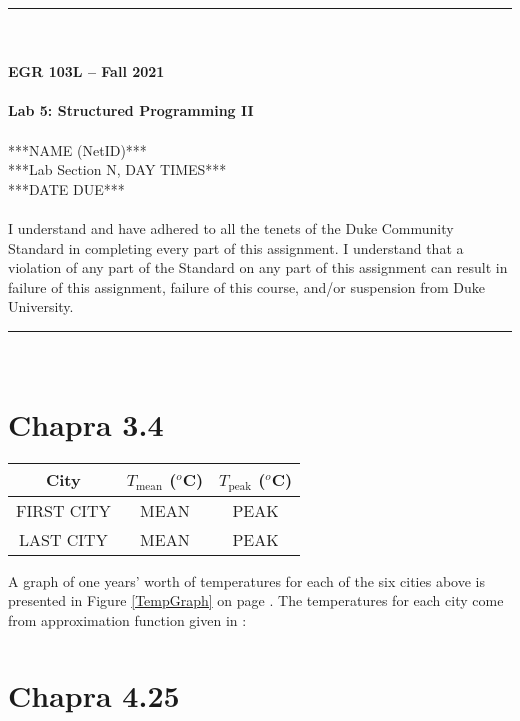 \documentclass{article}
\begin{document}
\begin{center}
\rule{6.5in}{0.5mm}\\~\\
\textbf{\large EGR 103L -- Fall 2021}\\~\\
\textbf{\huge Lab 5: Structured Programming II}\\~\\
***NAME (NetID)***\\
***Lab Section N, DAY TIMES***\\
***DATE DUE***\\~\\
{\small I understand and have adhered to all the tenets of the Duke Community Standard in completing every part of this assignment.  I understand that a violation of any part of the Standard on any part of this assignment can result in failure of this assignment, failure of this course, and/or suspension from Duke University.} 
\rule{6.5in}{0.5mm}\\
\end{center}
\tableofcontents
\listoffigures
\pagebreak

\section{Chapra 3.4}
\renewcommand{\arraystretch}{1.3}
\begin{center}
\begin{tabular}{ccc}\hline
City & $T_{\mbox{mean}}$ ($^o$C) & $T_{\mbox{peak}}$ ($^o$C) \\ \hline
FIRST CITY & MEAN & PEAK \\
LAST CITY & MEAN & PEAK \\ \hline
\end{tabular}
\end{center}
A graph of one years' worth of temperatures for each of the six cities
above is presented in Figure \ref{TempGraph} on page
\pageref{TempGraph}.  The temperatures for each city come from
approximation function given in \cite{Chapra}:
\begin{align*}
\end{align*}

\section{Chapra 4.25}
\end{document}
